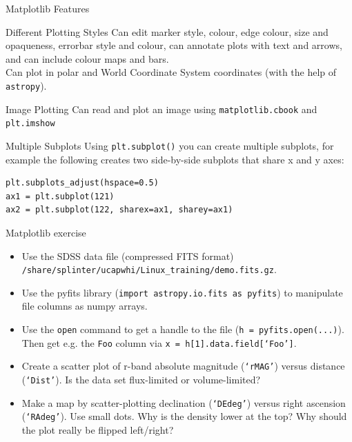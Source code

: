 \documentclass{beamer}
\begin{document}
\begin{frame}[fragile]{Matplotlib Features}
  \fontsize{11pt}{11}\selectfont
  \begin{block}{Different Plotting Styles}
     Can edit marker style, colour, edge colour, size and opaqueness, errorbar style and colour, can annotate plots with text and arrows, and can include colour maps and bars. \\
     Can plot in polar and World Coordinate System coordinates (with the help of \texttt{astropy}).
  \end{block}
  \begin{block}{Image Plotting}
     Can read and plot an image using \texttt{matplotlib.cbook} and \texttt{plt.imshow}
  \end{block}
  \begin{block}{Multiple Subplots}
     Using \texttt{plt.subplot()} you can create multiple subplots, for example the following creates two side-by-side subplots that share x and y axes:\\
     \begin{lstlisting}
plt.subplots_adjust(hspace=0.5)
ax1 = plt.subplot(121)
ax2 = plt.subplot(122, sharex=ax1, sharey=ax1)
     \end{lstlisting}
  \end{block}
\end{frame}


\begin{frame}{Matplotlib exercise}

  \begin{itemize}

  \item Use the SDSS data file (compressed FITS format) \texttt{/share/splinter/ucapwhi/Linux\_training/demo.fits.gz}.
  
  \item Use the pyfits library (\texttt{import astropy.io.fits as pyfits}) to manipulate file columns as numpy arrays.
  
  \item Use the \texttt{open} command to get a handle to the file (\texttt{h = pyfits.open(...)}). Then get e.g. the \texttt{Foo} column via \texttt{x = h[1].data.field[`Foo']}.
  
  \item Create a scatter plot of r-band absolute magnitude (\texttt{`rMAG'}) versus distance (\texttt{`Dist'}). Is the data set flux-limited or volume-limited?
  
  \item Make a map by scatter-plotting declination (\texttt{`DEdeg'}) versus right ascension (\texttt{`RAdeg'}). Use small dots. Why is the density lower at the top? Why should the plot really be flipped left/right?
  
  \end{itemize}

\end{frame}
\end{document}
